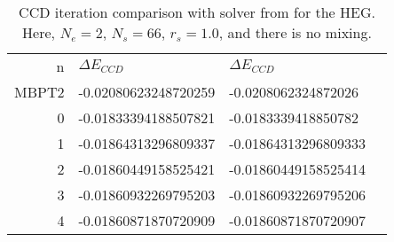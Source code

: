 \documentclass[twoside,english]{uiofysmaster}
\theoremstyle{definition}
\begin{document}
\begin{table}[h]
	\centering
	\captionsetup{width=.8\textwidth}
	\caption{CCD iteration comparison with solver from \cite{Hjorth-Jensenadvancedcoursecomputational2017} for the HEG. Here, $N_e=2$, $N_s=66$, $r_s=1.0$, and there is no mixing. }
	\begin{tabular}{rlll}
		n & $\Delta E_{CCD}$     & $\Delta E_{CCD}$ \cite{Hjorth-Jensenadvancedcoursecomputational2017} \\
		MBPT2 & -0.02080623248720259 & -0.0208062324872026  \\
		0 & -0.01833394188507821 & -0.0183339418850782  \\
		1 & -0.01864313296809337 & -0.01864313296809333 \\
		2 & -0.01860449158525421 & -0.01860449158525414 \\
		3 & -0.01860932269795203 & -0.01860932269795206 \\
		4 & -0.01860871870720909 & -0.01860871870720907 \\
	\end{tabular}
	\label{tab:unittest}
\end{table}
\end{document}
